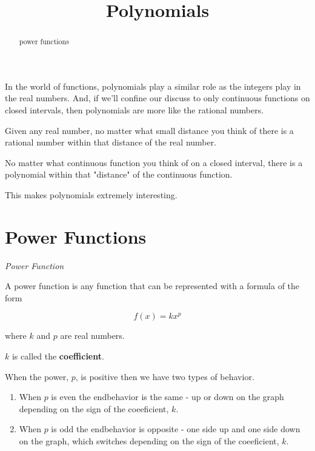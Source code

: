 \documentclass{ximera}
\title{Polynomials}
\begin{document}
\begin{abstract}
power functions
\end{abstract}
\maketitle


In the world of functions, polynomials play a similar role as the integers play in the real numbers. And, if we'll confine our discuss to only continuous functions on closed intervals, then polynomials are more like the rational numbers.  


Given any real number, no matter what small distance you think of there is a rational number within that distance of the real number.

No matter what continuous function you think of on a closed interval, there is a polynomial within that "distance" of the continuous function.

This makes polynomials extremely interesting.






\section{Power Functions}

\begin{definition} \textit{Power Function}

A power function is any function that can be represented with a formula of the form

\[   f(x) = k x^p      \]

where $k$ and $p$ are real numbers.

$k$ is called the \textbf{coefficient}.


\end{definition}



When the power, $p$, is positive then we have two types of behavior.

\begin{enumerate}
\item When $p$ is even the endbehavior is the same - up or down on the graph depending on the sign of the coeeficient, $k$.
\item When $p$ is odd the endbehavior is opposite - one side up and one side down on the graph, which switches depending on the sign of the coeeficient, $k$.
\end{enumerate}
\end{document}
